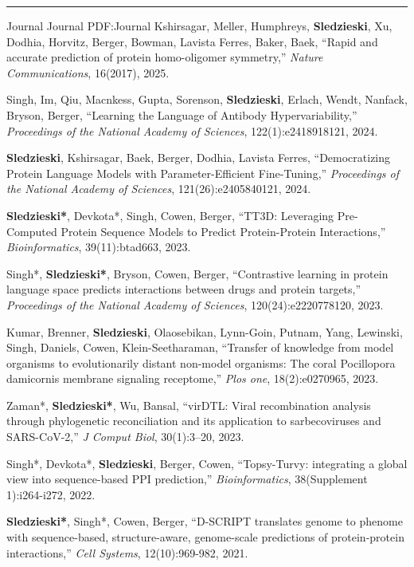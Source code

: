 \documentclass[letterpaper,MMMyyyy,nonstopmode]{simpleresumecv}
\begin{document}
\begin{Body}
\BigGap
\hrule
\Section
{Journal}
{Journal}
{PDF:Journal}
\Gap
\NumberedItem{[9]}
{{Kshirsagar, Meller, Humphreys, \textbf{Sledzieski}, Xu, Dodhia, Horvitz, Berger, Bowman, Lavista Ferres, Baker, Baek}, 
``Rapid and accurate prediction of protein homo-oligomer symmetry,'' 
\textit{Nature Communications}, 16(2017), 2025.
}

\Gap
\NumberedItem{[8]}
{{Singh, Im, Qiu, Macnkess, Gupta, Sorenson, \textbf{Sledzieski}, Erlach, Wendt, Nanfack, Bryson, Berger}, 
``Learning the Language of Antibody Hypervariability,'' 
\textit{Proceedings of the National Academy of Sciences}, 122(1):e2418918121, 2024.
}

\Gap
\NumberedItem{[7]}
{{\textbf{Sledzieski}, Kshirsagar, Baek, Berger, Dodhia, Lavista Ferres}, 
``Democratizing Protein Language Models with Parameter-Efficient Fine-Tuning,'' 
\textit{Proceedings of the National Academy of Sciences}, 121(26):e2405840121, 2024.
}

\Gap
\NumberedItem{[6]}
{{\textbf{Sledzieski*}, Devkota*, Singh, Cowen, Berger}, 
``TT3D: Leveraging Pre-Computed Protein Sequence Models to Predict Protein-Protein Interactions,'' 
\textit{Bioinformatics}, 39(11):btad663, 2023.
}

\Gap
\NumberedItem{[5]}
{{Singh*, \textbf{Sledzieski*}, Bryson, Cowen, Berger}, 
``Contrastive learning in protein language space predicts interactions between drugs and protein targets,'' 
\textit{Proceedings of the National Academy of Sciences}, 120(24):e2220778120, 2023.
}

\Gap
\NumberedItem{[4]}
{{Kumar, Brenner, \textbf{Sledzieski}, Olaosebikan, Lynn-Goin, Putnam, Yang, Lewinski, Singh, Daniels, Cowen, Klein-Seetharaman}, 
``Transfer of knowledge from model organisms to evolutionarily distant non-model organisms: The coral Pocillopora damicornis membrane signaling receptome,'' 
\textit{Plos one}, 18(2):e0270965, 2023.
}

\Gap
\NumberedItem{[3]}
{{Zaman*, \textbf{Sledzieski*}, Wu, Bansal}, 
``virDTL: Viral recombination analysis through phylogenetic reconciliation and its application to sarbecoviruses and SARS-CoV-2,'' 
\textit{J Comput Biol}, 30(1):3--20, 2023.
}

\Gap
\NumberedItem{[2]}
{{Singh*, Devkota*, \textbf{Sledzieski}, Berger, Cowen}, 
``Topsy-Turvy: integrating a global view into sequence-based PPI prediction,'' 
\textit{Bioinformatics}, 38(Supplement 1):i264-i272, 2022.
}

\Gap
\NumberedItem{[1]}
{{\textbf{Sledzieski*}, Singh*, Cowen, Berger}, 
``D-SCRIPT translates genome to phenome with sequence-based, structure-aware, genome-scale predictions of protein-protein interactions,'' 
\textit{Cell Systems}, 12(10):969-982, 2021.
}



\end{Body}
\end{document}
